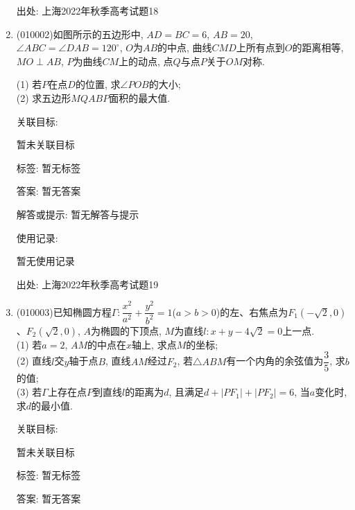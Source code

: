 \documentclass[10pt,a4paper]{article}
\begin{document}
\begin{enumerate}[1.]
出处: 上海2022年秋季高考试题18
\item { (010002)}如图所示的五边形中, $AD=BC=6$, $AB=20$, $\angle ABC=\angle DAB=120^\circ$, $O$为$AB$的中点, 曲线$CMD$上所有点到$O$的距离相等, $MO\perp AB$, $P$为曲线$CM$上的动点, 点$Q$与点$P$关于$OM$对称.
\begin{center}
\end{center}
(1) 若$P$在点$D$的位置, 求$\angle POB$的大小;\\
(2) 求五边形$MQABP$面积的最大值.


关联目标:

暂未关联目标



标签: 暂无标签

答案: 暂无答案

解答或提示: 暂无解答与提示

使用记录:

暂无使用记录


出处: 上海2022年秋季高考试题19
\item { (010003)}已知椭圆方程$\Gamma: \dfrac{x^2}{a^2}+\dfrac{y^2}{b^2}=1$($a>b>0$)的左、右焦点为$F_1(-\sqrt{2},0)$、$F_2(\sqrt{2},0)$, $A$为椭圆的下顶点, $M$为直线$l:x+y-4\sqrt{2}=0$上一点.\\
(1) 若$a=2$, $AM$的中点在$x$轴上, 求点$M$的坐标;\\
(2) 直线$l$交$y$轴于点$B$, 直线$AM$经过$F_2$, 若$\triangle ABM$有一个内角的余弦值为$\dfrac 35$, 求$b$的值;\\
(3) 若$\Gamma$上存在点$P$到直线$l$的距离为$d$, 且满足$d+|PF_1|+|PF_2|=6$, 当$a$变化时, 求$d$的最小值.


关联目标:

暂未关联目标



标签: 暂无标签

答案: 暂无答案


\end{enumerate}
\end{document}
